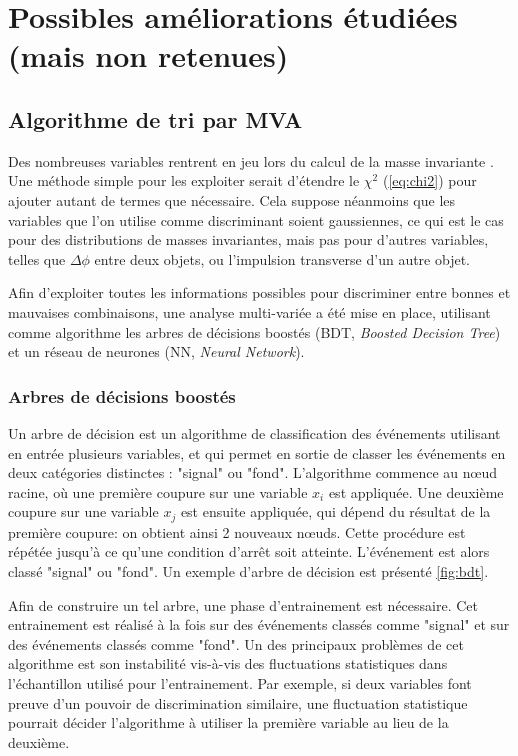 \section{Possibles améliorations étudiées (mais non retenues)} \label{sec:reco_tests}

\subsection{Algorithme de tri par MVA} \label{sec:mva}

Des nombreuses variables rentrent en jeu lors du calcul de la masse invariante \ttbar. Une méthode simple pour les exploiter serait d'étendre le $\chi^2$ (\cref{eq:chi2}) pour ajouter autant de termes que nécessaire. Cela suppose néanmoins que les variables que l'on utilise comme discriminant soient gaussiennes, ce qui est le cas pour des distributions de masses invariantes, mais pas pour d'autres variables, telles que $\Delta \phi$ entre deux objets, ou l'impulsion transverse d'un autre objet.

Afin d'exploiter toutes les informations possibles pour discriminer entre bonnes et mauvaises combinaisons, une analyse multi-variée a été mise en place, utilisant comme algorithme les arbres de décisions boostés (BDT, \emph{Boosted Decision Tree}) et un réseau de neurones (NN, \emph{Neural Network}).


\subsubsection{Arbres de décisions boostés}

Un arbre de décision est un algorithme de classification des événements utilisant en entrée plusieurs variables, et qui permet en sortie de classer les événements en deux catégories distinctes : "signal" ou "fond". L'algorithme commence au nœud racine, où une première coupure sur une variable $x_i$ est appliquée. Une deuxième coupure sur une variable $x_j$ est ensuite appliquée, qui dépend du résultat de la première coupure: on obtient ainsi 2 nouveaux nœuds. Cette procédure est répétée jusqu'à ce qu'une condition d'arrêt soit atteinte. L'événement est alors classé "signal" ou "fond". Un exemple d'arbre de décision est présenté \cref{fig:bdt}.

Afin de construire un tel arbre, une phase d'entrainement est nécessaire. Cet entrainement est réalisé à la fois sur des événements classés comme "signal" et sur des événements classés comme "fond". Un des principaux problèmes de cet algorithme est son instabilité vis-à-vis des fluctuations statistiques dans l'échantillon utilisé pour l'entrainement. Par exemple, si deux variables font preuve d'un pouvoir de discrimination similaire, une fluctuation statistique pourrait décider l'algorithme à utiliser la première variable au lieu de la deuxième.

